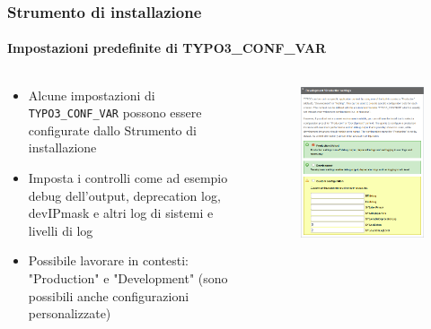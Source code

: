 \begin{frame}[fragile]
	\frametitle{Strumento di installazione}
	\framesubtitle{Impostazioni predefinite di TYPO3\_CONF\_VAR}

	\begin{columns}[T]
		\begin{column}{.5\textwidth}

			\begin{itemize}
				\item Alcune impostazioni di \texttt{TYPO3\_CONF\_VAR} possono essere configurate dallo Strumento di installazione
				\item Imposta i controlli come ad esempio debug dell'output, deprecation log, devIPmask e altri log di sistemi e livelli di log
				\item Possibile lavorare in contesti: "Production" e "Development"\newline
					(sono possibili anche configurazioni personalizzate)
			\end{itemize}

		\end{column}
		\begin{column}{.5\textwidth}

			\begin{figure}\vspace*{-0.4cm}
				\includegraphics[width=0.8\linewidth]{Images/InstallTool/ApplicationContext.png}
			\end{figure}

		\end{column}
	\end{columns}

\end{frame}

